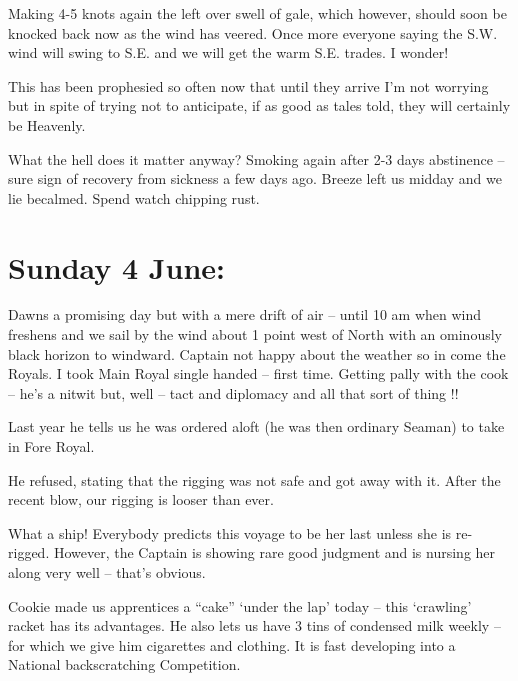 \documentclass[
  11pt,
  msmallroyalvopaper
]{memoir}
\begin{document}
Making 4-5 knots again the left over swell of gale, which however,
should soon be knocked back now as the wind has veered. Once more
everyone saying the S.W. wind will swing to S.E. and we will get the
warm S.E. trades. I wonder!

This has been prophesied so often now that until they arrive I'm not
worrying but in spite of trying not to anticipate, if as good as tales
told, they will certainly be Heavenly.

What the hell does it matter anyway? Smoking again after 2-3 days
abstinence -- sure sign of recovery from sickness a few days ago. Breeze
left us midday and we lie becalmed. Spend watch chipping rust.

\hypertarget{sunday-4-june}{%
\section{Sunday 4 June:}\label{sunday-4-june}}

Dawns a promising day but with a mere drift of air -- until 10 am when
wind freshens and we sail by the wind about 1 point west of North with
an ominously black horizon to windward. Captain not happy about the
weather so in come the Royals. I took Main Royal single handed -- first
time. Getting pally with the cook -- he's a nitwit but, well -- tact and
diplomacy and all that sort of thing !!

Last year he tells us he was ordered aloft (he was then ordinary Seaman)
to take in Fore Royal.

He refused, stating that the rigging was not safe and got away with it.
After the recent blow, our rigging is looser than ever.

What a ship! Everybody predicts this voyage to be her last unless she is
re-rigged. However, the Captain is showing rare good judgment and is
nursing her along very well -- that's obvious.

Cookie made us apprentices a ``cake'' `under the lap' today -- this
`crawling' racket has its advantages. He also lets us have 3 tins of
condensed milk weekly -- for which we give him cigarettes and clothing.
It is fast developing into a National backscratching Competition.
\end{document}
